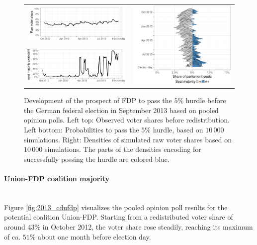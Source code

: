 \documentclass[smallcondensed]{svjour3}     %
\begin{document}
\begin{figure}[H]\centering
\begin{tabular}{ll}
\includegraphics[height=.15\textwidth]{figures/2013_pooled_fdp_rawShares.pdf}
&
\multirow{2}{*}[13ex]{\includegraphics[height=30ex]{figures/2013_pooled_fdp_ridgeline.pdf}}
\\
\includegraphics[height=.15\textwidth]{figures/2013_pooled_fdp_passingProb.pdf}
\end{tabular}
\caption{Development of the prospect of FDP to pass the $5\%$ hurdle before the German federal election in September 2013 based on pooled opinion polls.
Left top: Observed voter shares before redistribution. Left bottom: Probabilities to pass the $5\%$ hurdle, based on $10\,000$ simulations. Right: Densities of simulated raw voter shares based on $10\,000$ simulations. The parts of the densities encoding for successfully possing the hurdle are colored blue.
\label{fig:2013_fdp}
}
\end{figure}


\paragraph{Union-FDP coalition majority} \ \\
Figure \ref{fig:2013_cdufdp} visualizes the pooled opinion poll results
for the potential coalition Union-FDP.
Starting from a redistributed voter share of around $43\%$ in October 2012,
the voter share rose steadily, reaching its maximum
of ca. $51\%$ about one month before election day.
\end{document}
